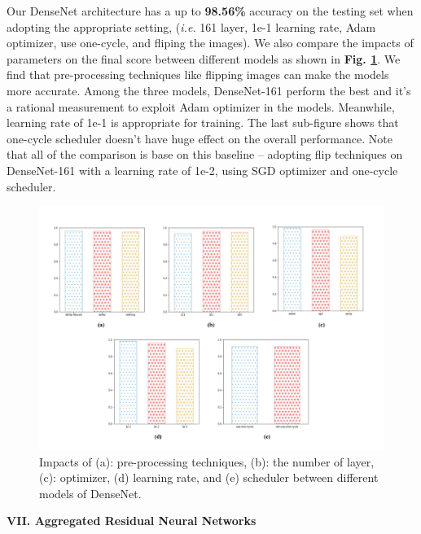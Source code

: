 \documentclass[a4paper]{article}
\begin{document}
\large{
Our \textsf{DenseNet} architecture has a up to \textbf{98.56\%} accuracy on the testing set when adopting the appropriate setting, (\textit{i.e.} 161 layer, 1e-1 learning rate, Adam optimizer, use one-cycle, and fliping the images). We also compare the impacts of parameters on the final score between different models as shown in \textbf{Fig. \ref{densecompare}}. We find that pre-processing techniques like flipping images can make the models more accurate. Among the three models, \textsf{DenseNet-161} perform the best and it's a rational measurement to exploit Adam optimizer in the models. Meanwhile, learning rate of 1e-1 is appropriate for training. The last sub-figure shows that one-cycle scheduler doesn't have huge effect on the overall performance. Note that all of the comparison is base on this baseline -- adopting flip techniques on \textsf{DenseNet-161} with a learning rate of 1e-2, using SGD optimizer and one-cycle scheduler.

\begin{figure}[h]
\centering
\includegraphics[width=15cm]{dense.pdf}
\caption{ Impacts of (a): pre-processing techniques, (b): the number of layer, (c): optimizer, (d) learning rate, and (e) scheduler between different models of \textsf{DenseNet}.}
\label{densecompare}
\end{figure}

}
\clearpage
\vspace{5mm}
\begin{center}
\LARGE\textbf{VII. Aggregated Residual Neural Networks} \\
\end{center}
\vspace{2mm}
\end{document}

